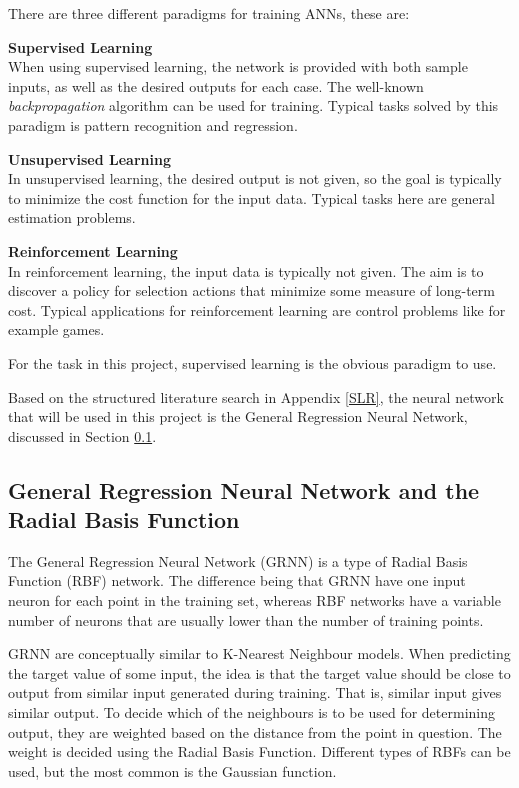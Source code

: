 \documentclass[12pt]{article}
\begin{document}
There are three different paradigms for training ANNs, these are:

\begin{description}
\item \textbf{Supervised Learning} \hfill \\
When using supervised learning, the network is provided with both sample inputs, as well as the desired outputs for each case. The well-known \textit{backpropagation} algorithm can be used for training. Typical tasks solved by this paradigm is pattern recognition and regression. 
\item \textbf{Unsupervised Learning} \hfill \\
In unsupervised learning, the desired output is not given, so the goal is typically to minimize the cost function for the input data. Typical tasks here are general estimation problems.
\item \textbf{Reinforcement Learning} \hfill \\
In reinforcement learning, the input data is typically not given. The aim is to discover a policy for selection actions that minimize some measure of long-term cost. Typical applications for reinforcement learning are control problems like for example games. 
\end{description}

For the task in this project, supervised learning is the obvious paradigm to use.

Based on the structured literature search in Appendix \ref{SLR}, the neural network that will be used in this project is the General Regression Neural Network, discussed in Section \ref{grnn}.

\subsection{General Regression Neural Network and the Radial Basis Function}
\label{grnn}
The General Regression Neural Network (GRNN)\cite{grnn} is a type of Radial Basis Function (RBF) network. The difference being that GRNN have one input neuron for each point in the training set, whereas RBF networks have a variable number of neurons that are usually lower than the number of training points.

GRNN are conceptually similar to K-Nearest Neighbour models. When predicting the target value of some input, the idea is that the target value should be close to output from similar input generated during training. That is, similar input gives similar output. To decide which of the neighbours is to be used for determining output, they are weighted based on the distance from the point in question. The weight is decided using the Radial Basis Function. Different types of RBFs can be used, but the most common is the Gaussian function. 
\end{document}
